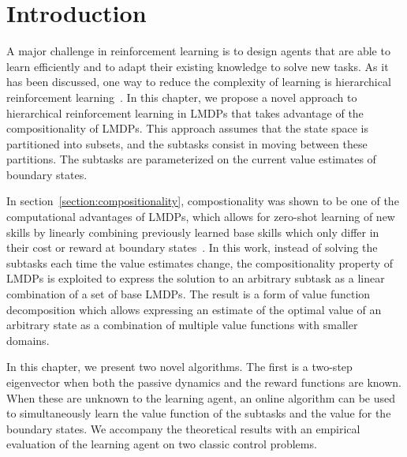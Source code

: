 \section{Introduction}
A major challenge in reinforcement learning is to design agents that are able to learn efficiently and to adapt their existing knowledge to solve new tasks. As it has been discussed, one way to reduce the complexity of learning is hierarchical reinforcement learning~\citep{Sutton1999, Dietterich2000, Barto2003}. In this chapter, we propose a novel approach to hierarchical reinforcement learning in LMDPs that takes advantage of the compositionality of LMDPs. This approach assumes that the state space is partitioned into subsets, and the subtasks consist in moving between these partitions. The subtasks are parameterized on the current value estimates of boundary states. 

In section~\ref{section:compositionality}, compostionality was shown to be one of the computational advantages of LMDPs, which allows for zero-shot learning of new skills by linearly combining previously learned base skills which only differ in their cost or reward at boundary states~\citep{Todorov2009,Silva2009}.  In this work, instead of solving the subtasks each time the value estimates change, the compositionality property of LMDPs is exploited to express the solution to an arbitrary subtask as a linear combination of a set of base LMDPs. The result is a form of value function decomposition which allows expressing an estimate of the optimal value of an arbitrary state as a combination of multiple value functions with smaller domains.

In this chapter, we present two novel algorithms. The first is a two-step eigenvector when both the passive dynamics and the reward functions are known. When these are unknown to the learning agent, an online algorithm can be used to simultaneously learn the value function of the subtasks and the value for the boundary states. 
We accompany the theoretical results with an empirical evaluation of the learning agent on two classic control problems.

